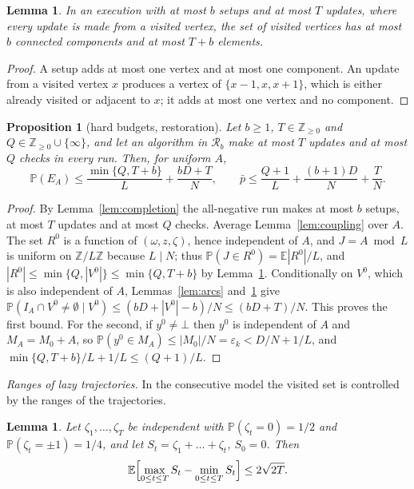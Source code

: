 \documentclass{amsart}
\theoremstyle{plain}
\newtheorem{lemma}[theorem]{Lemma}
\newtheorem{proposition}[theorem]{Proposition}
\theoremstyle{definition}
\theoremstyle{remark}
\newcommand{\Z}{\mathbb{Z}}
\newcommand{\E}{\mathbb{E}}
\renewcommand{\Pr}{\mathbb{P}}
\newcommand{\eps}{\varepsilon}
\newcommand{\res}{\mathcal{R}}
\begin{document}
\begin{lemma}\label{lem:visited}
In an execution with at most $b$ setups and at most $T$ updates, where every update is made from a visited vertex, the set of visited vertices has at most $b$ connected components and at most $T+b$ elements.
\end{lemma}

\begin{proof}
A setup adds at most one vertex and at most one component. An update from a visited vertex $x$ produces a vertex of $\{x-1,x,x+1\}$, which is either already visited or adjacent to $x$; it adds at most one vertex and no component.
\end{proof}

\begin{proposition}[hard budgets, restoration]\label{prop:hard-res}
Let $b\ge 1$, $T\in\Z_{\ge0}$ and $Q\in\Z_{\ge0}\cup\{\infty\}$, and let an algorithm in $\res_b$ make at most $T$ updates and at most $Q$ checks in every run. Then, for uniform $A$,
\[
\Pr(E_A)\le\frac{\min\{Q,T+b\}}{L}+\frac{bD+T}{N},
\qquad
\bar p\le\frac{Q+1}{L}+\frac{(b+1)D}{N}+\frac TN .
\]
\end{proposition}

\begin{proof}
By Lemma~\ref{lem:completion} the all-negative run makes at most $b$ setups, at most $T$ updates and at most $Q$ checks. Average Lemma~\ref{lem:coupling} over $A$. The set $R^0$ is a function of $(\omega,z,\zeta)$, hence independent of $A$, and $J=A\bmod L$ is uniform on $\Z/L\Z$ because $L\mid N$; thus $\Pr(J\in R^0)=\E|R^0|/L$, and $|R^0|\le\min\{Q,|V^0|\}\le\min\{Q,T+b\}$ by Lemma~\ref{lem:visited}. Conditionally on $V^0$, which is also independent of $A$, Lemmas~\ref{lem:arcs} and~\ref{lem:visited} give $\Pr(I_A\cap V^0\neq\emptyset\mid V^0)\le(bD+|V^0|-b)/N\le(bD+T)/N$. This proves the first bound. For the second, if $y^0\neq\bot$ then $y^0$ is independent of $A$ and $M_A=M_0+A$, so $\Pr(y^0\in M_A)\le|M_0|/N=\eps_k<D/N+1/L$, and $\min\{Q,T+b\}/L+1/L\le(Q+1)/L$.
\end{proof}

\emph{Ranges of lazy trajectories.}
In the consecutive model the visited set is controlled by the ranges of the trajectories.

\begin{lemma}\label{lem:range}
Let $\zeta_1,\dots,\zeta_T$ be independent with $\Pr(\zeta_t=0)=1/2$ and $\Pr(\zeta_t=\pm1)=1/4$, and let $S_t=\zeta_1+\dots+\zeta_t$, $S_0=0$. Then
\[
\E\Bigl[\max_{0\le t\le T}S_t-\min_{0\le t\le T}S_t\Bigr]\le 2\sqrt{2T}.
\]
\end{lemma}
\end{document}
